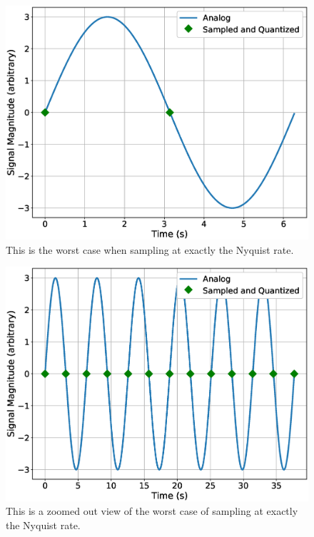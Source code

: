 \begin{figure}[!htb]
	\centering
	\includegraphics[scale=0.5]{dataCollection/nyquist2.eps}
	\caption{This is the worst case when sampling at exactly the Nyquist rate.}
	\label{fig:nyquist2}
\end{figure}

\begin{figure}[!htb]
	\centering
	\includegraphics[scale=0.5]{dataCollection/nyquist3.eps}
	\caption{This is a zoomed out view of the worst case of sampling at exactly the Nyquist rate.}
	\label{fig:nyquist3}
\end{figure}

